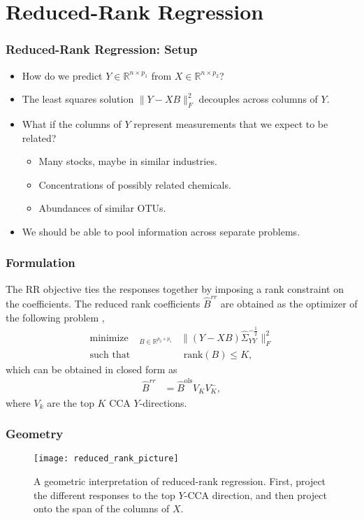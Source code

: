 \documentclass[10pt]{beamer}\usepackage[]{graphicx}\usepackage[]{color}
\def\reals{\mathbb{R}} %
\providecommand{\minimize}{\mathop\mathrm{minimize\quad}} %
\begin{document}
\section{Reduced-Rank Regression}

\begin{frame}
\frametitle{Reduced-Rank Regression: Setup}
\begin{itemize}
\item How do we predict $Y \in \reals^{n \times p_{1}}$ from $X \in \reals^{n \times p_{2}}$?
\item The least squares solution $\|Y - XB\|_{F}^{2}$ decouples across columns of $Y$.
\item What if the columns of $Y$ represent measurements that we expect to be
  related?
  \begin{itemize}
  \item Many stocks, maybe in similar industries.
  \item Concentrations of possibly related chemicals.
  \item Abundances of similar OTUs.
  \end{itemize}
\item We should be able to pool information across separate problems.
\end{itemize}
\end{frame}

\begin{frame}
\frametitle{Formulation}

The RR objective ties the responses together by imposing a rank constraint
on the coefficients. The reduced rank coefficients $\hat{B}^{rr}$ are obtained
as the optimizer of the following problem \cite{izenman1975reduced},
\begin{align}
\minimize_{B \in \reals^{p_{2} \times p_{1}}} &\|\left(Y - XB\right)\hat{\Sigma}_{YY}^{-\frac{1}{2}}\|_{F}^{2} \label{eq:rr_obj}\\
\text{such that } &\text{ rank}\left(B\right) \leq K,
\end{align}
which can be obtained in closed form as
\begin{align}
  \hat{B}^{rr} &= \hat{B}^{\text{ols}}V_{K}V_{K}^{-},
\end{align}
where $V_{k}$ are the top $K$ CCA $Y$-directions.
\end{frame}

\begin{frame}
  \frametitle{Geometry}
\begin{figure}
  \texttt{[image: reduced\_rank\_picture]}
  \caption{A geometric interpretation of reduced-rank regression. First, project
    the different responses to the top $Y$-CCA direction, and then project onto
    the span of the columns of $X$.}
\end{figure}
\end{frame}
\end{document}

